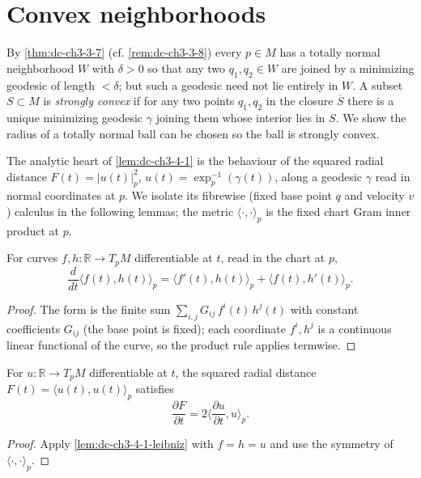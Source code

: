 \section{Convex neighborhoods}

By \cref{thm:dc-ch3-3-7} (cf. \cref{rem:dc-ch3-3-8}) every $p\in M$ has a totally normal neighborhood
$W$ with $\delta>0$ so that any two $q_1,q_2\in W$ are joined by a minimizing
geodesic of length $<\delta$; but such a geodesic need not lie entirely in $W$. A
subset $S\subset M$ is \emph{strongly convex} if for any two points $q_1,q_2$ in the
closure $\overline{S}$ there is a unique minimizing geodesic $\gamma$ joining them
whose interior lies in $S$. We show the radius of a totally normal ball can be
chosen so the ball is strongly convex.

The analytic heart of \cref{lem:dc-ch3-4-1} is the behaviour of the squared radial
distance $F(t)=|u(t)|_p^2$, $u(t)=\exp_p^{-1}(\gamma(t))$, along a geodesic $\gamma$
read in normal coordinates at $p$. We isolate its fibrewise (fixed base point $q$
and velocity $v$) calculus in the following lemmas; the metric
$\langle\cdot,\cdot\rangle_p$ is the fixed chart Gram inner product at $p$.

\begin{lemma}
  \label{lem:dc-ch3-4-1-leibniz}
  \leanok
  For curves $f,h:\mathbb{R}\to T_pM$ differentiable at $t$, read in the chart at
  $p$,
  $$\frac{d}{dt}\langle f(t),h(t)\rangle_p
    = \langle f'(t),h(t)\rangle_p + \langle f(t),h'(t)\rangle_p.$$
\end{lemma}
\begin{proof}
  \sketch
  \leanok
  The form is the finite sum $\sum_{i,j}G_{ij}\,f^i(t)\,h^j(t)$ with constant
  coefficients $G_{ij}$ (the base point is fixed); each coordinate $f^i,h^j$ is a
  continuous linear functional of the curve, so the product rule applies termwise.
\end{proof}

\begin{lemma}
  \label{lem:dc-ch3-4-1-dF}
  \leanok
  For $u:\mathbb{R}\to T_pM$ differentiable at $t$, the squared radial distance
  $F(t)=\langle u(t),u(t)\rangle_p$ satisfies
  $$\frac{\partial F}{\partial t}=2\Big\langle\frac{\partial u}{\partial t},u\Big\rangle_p.$$
\end{lemma}
\begin{proof}
  \sketch
  \leanok
  Apply \cref{lem:dc-ch3-4-1-leibniz} with $f=h=u$ and use the symmetry of
  $\langle\cdot,\cdot\rangle_p$.
\end{proof}

